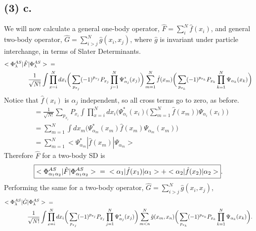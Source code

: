 \documentclass[11 pt, a4paper]{article}
\begin{document}
\subsection*{(3) c.}
We will now calculate a general one-body operator, $\hat{F} = \sum_i^N \hat{f}(x_i)$, and general two-body operator, $\hat{G} = \sum\limits_{i>j}^N \hat{g}(x_i,x_j)$, where $\hat{g}$ is invariant under particle interchange, in terms of Slater Determinants.
\begin{align*}
<\Phi_{\lambda}^{AS}|\hat{F}&|\Phi_{\lambda}^{AS}> \hspace{0.2 cm} =\\
& \frac{1}{\sqrt{N!}}\int\prod_{x=i}^Ndx_i \bigg(\sum\limits_{p_{x_j}} (-1)^{p_{x_j}} P_{x_j} \prod\limits_{j=1}^N \Psi_{\alpha_j}^* (x_j)\bigg)\sum\limits_{m=1}^N\hat{f}(x_m)\bigg(\sum\limits_{p_{x_k}} (-1)^{p_{x_k}} P_{x_k} \prod\limits_{k=1}^N \Psi_{\alpha_k} (x_k)\bigg)
\end{align*}
Notice that $\hat{f}(x_i)$ is $\alpha_j$ independent, so all cross terms go to zero, as before.
\begin{align*}
&= \frac{1}{\sqrt{N!}}\sum\limits_{p_{x_i}} P_{x_i}\int\prod_{x=i}^Ndx_i \bigg(\Psi_{\alpha_i}^* (x_i)\bigg(\sum\limits_{m=1}^N\hat{f}(x_m)\bigg) \Psi_{\alpha_i} (x_i)\bigg) \\
&= \sum\limits_{m=1}^N\int dx_m \bigg(\Psi_{\alpha_m}^* (x_m)\hat{f}(x_m)\Psi_{\alpha_m} (x_m)\bigg) \\
&= \sum\limits_{m=1}^N <\Psi_{\alpha_m}^*|\hat{f}(x_m)|\Psi_{\alpha_m}>
\end{align*}
Therefore $\hat{F}$ for a two-body SD is
\begin{equation*}
\boxed{<\Phi_{\alpha_1\alpha_2}^{AS}|\hat{F}|\Phi_{\alpha_1\alpha_2}^{AS}> \hspace{0.2 cm} = \hspace{0.2 cm} <\alpha_1|\hat{f}(x_1)|\alpha_1> + <\alpha_2|\hat{f}(x_2)|\alpha_2>}.
\end{equation*}
\newline
\newline
Performing the same for a two-body operator, $\hat{G} = \sum_{i>j}^N\hat{g}(x_i,x_j)$,
\begin{align*}
<\Phi_{\lambda}^{AS}|\hat{G}&|\Phi_{\lambda}^{AS}> \hspace{0.2 cm} = \\
& \frac{1}{\sqrt{N!}}\int\prod_{x=i}^Ndx_i \bigg(\sum\limits_{p_{x_j}} (-1)^{p_{x_j}} P_{x_j} \prod\limits_{j=1}^N \Psi_{\alpha_j}^* (x_j)\bigg)\sum\limits_{m<n}^N\hat{g}(x_m,x_n)\bigg(\sum\limits_{p_{x_k}} (-1)^{p_{x_k}} P_{x_k} \prod\limits_{k=1}^N \Psi_{\alpha_k} (x_k)\bigg).
\end{align*}
\end{document}
